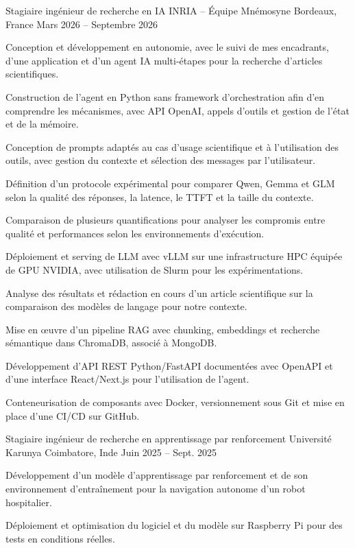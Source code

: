 
\begin{cventries}
  \cventry
    {Stagiaire ingénieur de recherche en IA}
    {INRIA -- Équipe Mnémosyne}
    {Bordeaux, France}
    {Mars 2026 -- Septembre 2026}
    {
      \begin{cvitems}
        \item {Conception et développement en autonomie, avec le suivi de mes encadrants, d’une application et d’un agent IA multi-étapes pour la recherche d’articles scientifiques.}
        \item {Construction de l’agent en Python sans framework d’orchestration afin d’en comprendre les mécanismes, avec API OpenAI, appels d’outils et gestion de l’état et de la mémoire.}
        \item {Conception de prompts adaptés au cas d’usage scientifique et à l’utilisation des outils, avec gestion du contexte et sélection des messages par l’utilisateur.}
        \item {Définition d’un protocole expérimental pour comparer Qwen, Gemma et GLM selon la qualité des réponses, la latence, le TTFT et la taille du contexte.}
        \item {Comparaison de plusieurs quantifications pour analyser les compromis entre qualité et performances selon les environnements d’exécution.}
        \item {Déploiement et serving de LLM avec vLLM sur une infrastructure HPC équipée de GPU NVIDIA, avec utilisation de Slurm pour les expérimentations.}
        \item {Analyse des résultats et rédaction en cours d’un article scientifique sur la comparaison des modèles de langage pour notre contexte.}
        \item {Mise en œuvre d’un pipeline RAG avec chunking, embeddings et recherche sémantique dans ChromaDB, associé à MongoDB.}
        \item {Développement d’API REST Python/FastAPI documentées avec OpenAPI et d’une interface React/Next.js pour l’utilisation de l’agent.}
        \item {Conteneurisation de composants avec Docker, versionnement sous Git et mise en place d’une CI/CD sur GitHub.}
      \end{cvitems}
    }

  \cventry
    {Stagiaire ingénieur de recherche en apprentissage par renforcement}
    {Université Karunya}
    {Coimbatore, Inde}
    {Juin 2025 -- Sept. 2025}
    {
      \begin{cvitems}
        \item {Développement d’un modèle d’apprentissage par renforcement et de son environnement d’entraînement pour la navigation autonome d’un robot hospitalier.}
        \item {Déploiement et optimisation du logiciel et du modèle sur Raspberry Pi pour des tests en conditions réelles.}
      \end{cvitems}
    }
\end{cventries}
